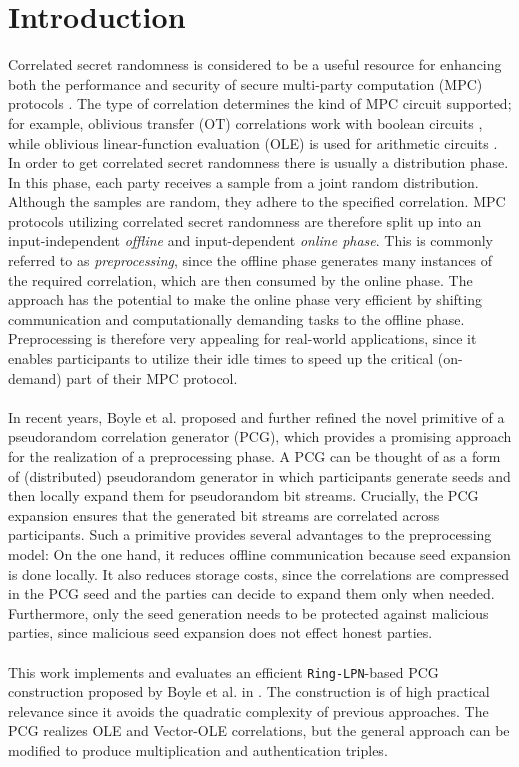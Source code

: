 \chapter{Introduction}
Correlated secret randomness is considered to be a useful resource for enhancing both the performance and security of secure multi-party computation (MPC) protocols \cite{ishai2013power}. The type of correlation determines the kind of MPC circuit supported; for example, oblivious transfer (OT) correlations work with boolean circuits \cite{goldreich2019play}, while oblivious linear-function evaluation (OLE) is used for arithmetic circuits \cite{ishai2009secure}. In order to get correlated secret randomness there is usually a distribution phase. In this phase, each party receives a sample from a joint random distribution. Although the samples are random, they adhere to the specified correlation. MPC protocols utilizing correlated secret randomness are therefore split up into an input-independent \textit{offline} and input-dependent \textit{online phase}. This is commonly referred to as \textit{preprocessing}, since the offline phase generates many instances of the required correlation, which are then consumed by the online phase. The approach has the potential to make the online phase very efficient by shifting communication and computationally demanding tasks to the offline phase. Preprocessing is therefore very appealing for real-world applications, since it enables participants to utilize their idle times to speed up the critical (on-demand) part of their MPC protocol.
\\\\
In recent years, Boyle et al. proposed \cite{boyle2015function} and further refined \cite{boyle2016function, boyle2020efficient} the novel primitive of a pseudorandom correlation generator (PCG), which provides a promising approach for the realization of a preprocessing phase. A PCG can be thought of as a form of (distributed) pseudorandom generator in which participants generate seeds and then locally expand them for pseudorandom bit streams. Crucially, the PCG expansion ensures that the generated bit streams are correlated across participants. Such a primitive provides several advantages to the preprocessing model: On the one hand, it reduces offline communication because seed expansion is done locally. It also reduces storage costs, since the correlations are compressed in the PCG seed and the parties can decide to expand them only when needed. Furthermore, only the seed generation needs to be protected against malicious parties, since malicious seed expansion does not effect honest parties.
\\\\
This work implements and evaluates an efficient \texttt{Ring-LPN}-based PCG construction proposed by Boyle et al. in \cite{boyle2020efficient}. The construction is of high practical relevance since it avoids the quadratic complexity of previous approaches. The PCG realizes OLE and Vector-OLE correlations, but the general approach can be modified to produce multiplication and authentication triples.


